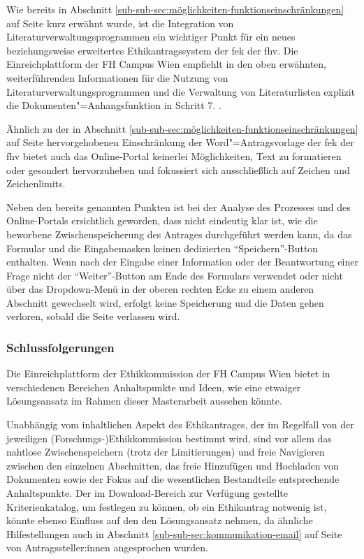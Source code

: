 \documentclass[a4paper,12pt,twoside]{scrreprt}
\begin{document}
\medskip

Wie bereits in Abschnitt \ref{sub-sub-sec:möglichkeiten-funktionseinschränkungen} auf Seite \pageref{sub-sub-sec:möglichkeiten-funktionseinschränkungen} kurz erwähnt wurde, ist die Integration von Literaturverwaltungsprogrammen ein wichtiger Punkt für ein neues beziehungsweise erweitertes Ethikantragssystem der \acl{fek} der \acl{fhv}. Die Einreichplattform der FH Campus Wien empfiehlt in den oben erwähnten, weiterführenden Informationen für die Nutzung von Literaturverwaltungsprogrammen und die Verwaltung von Literaturlisten explizit die Dokumenten"=Anhangsfunktion in Schritt 7. \cite[5]{ethikkommission_fh_campus_wien_wissenswertes_2022}.

\medskip

Ähnlich zu der in Abschnitt \ref{sub-sub-sec:möglichkeiten-funktionseinschränkungen} auf Seite \pageref{sub-sub-sec:möglichkeiten-funktionseinschränkungen} hervorgehobenen Einschränkung der Word"=Antragsvorlage der \ac{fek} der \ac{fhv} bietet auch das Online-Portal keinerlei Möglichkeiten, Text zu formatieren oder gesondert hervorzuheben und fokussiert sich ausschließlich auf Zeichen und Zeichenlimits.

\medskip

Neben den bereits genannten Punkten ist bei der Analyse des Prozesses und des Online-Portals ersichtlich geworden, dass nicht eindeutig klar ist, wie die beworbene Zwischenspeicherung des Antrages durchgeführt werden kann, da das Formular und die Eingabemasken keinen dedizierten \enquote{Speichern}-Button enthalten. Wenn nach der Eingabe einer Information oder der Beantwortung einer Frage nicht der \enquote{Weiter}-Button am Ende des Formulars verwendet oder nicht über das Dropdown-Menü in der oberen rechten Ecke zu einem anderen Abschnitt gewechselt wird, erfolgt keine Speicherung und die Daten gehen verloren, sobald die Seite verlassen wird.

\subsubsection*{Schlussfolgerungen}
\label{sub-sub-sec:schlussfolgerungen-fhcw}

Die Einreichplattform der Ethikkommission der FH Campus Wien bietet in verschiedenen Bereichen Anhaltspunkte und Ideen, wie eine etwaiger Lösungsansatz im Rahmen dieser Masterarbeit aussehen könnte.

Unabhängig vom inhaltlichen Aspekt des Ethikantrages, der im Regelfall von der jeweiligen (Forschungs-)Ethikkommission bestimmt wird, sind vor allem das nahtlose Zwischenspeichern (trotz der Limitierungen) und freie Navigieren zwischen den einzelnen Abschnitten, das freie Hinzufügen und Hochladen von Dokumenten sowie der Fokus auf die wesentlichen Bestandteile entsprechende Anhaltspunkte. Der im Download-Bereich zur Verfügung gestellte Kriterienkatalog, um festlegen zu können, ob ein Ethikantrag notwenig ist, könnte ebenso Einfluss auf den den Lösungsansatz nehmen, da ähnliche Hilfestellungen auch in Abschnitt \ref{sub-sub-sec:kommunikation-email} auf Seite \pageref{sub-sub-sec:kommunikation-email} von Antragssteller:innen angesprochen wurden.
\end{document}
